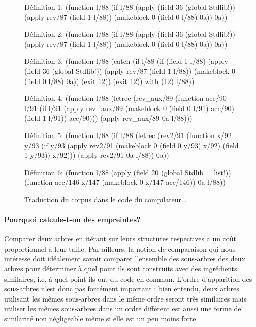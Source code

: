 \begin{figure}
\begin{lisp}
Définition 1: (function l/88
  (if l/88
    (apply (field 36 (global Stdlib!)) (apply rev/87 (field 1 l/88))
      (makeblock 0 (field 0 l/88) 0a))
    0a))

Définition 2: (function l/88
  (if l/88
    (apply (field 36 (global Stdlib!)) (apply rev/87 (field 1 l/88))
      (makeblock 0 (field 0 l/88) 0a))
    0a))

Définition 3: (function l/88
  (catch
    (if l/88
      (if (field 1 l/88)
        (apply (field 36 (global Stdlib!)) (apply rev/87 (field 1 l/88))
          (makeblock 0 (field 0 l/88) 0a))
        (exit 12))
      (exit 12))
   with (12) l/88))

Définition 4: (function l/88
  (letrec
    (rev_aux/89
       (function acc/90 l/91
         (if l/91
           (apply rev_aux/89 (makeblock 0 (field 0 l/91) acc/90)
             (field 1 l/91))
           acc/90)))
    (apply rev_aux/89 0a l/88)))

Définition 5: (function l/88
  (if l/88
    (letrec
      (rev2/91
         (function x/92 y/93
           (if y/93
             (apply rev2/91 (makeblock 0 (field 0 y/93) x/92) (field 1 y/93))
             x/92)))
      (apply rev2/91 0a l/88))
    0a))

Définition 6: (function l/88
  (apply (field 20 (global Stdlib__list!))
    (function acc/146 x/147 (makeblock 0 x/147 acc/146)) 0a l/88))
\end{lisp}
\caption{Traduction du corpus dans le code {\LambdaCode} du compilateur~\OCaml.}
\label{fig:lambda-corpus}
\end{figure}

\paragraph{Pourquoi calcule-t-on des empreintes?}

Comparer deux arbres en itérant sur leurs structures respectives a un
coût proportionnel à leur taille. Par ailleurs, la notion de
comparaison qui nous intéresse doit idéalement savoir comparer
l'ensemble des sous-arbres des deux arbres pour déterminer à quel
point ils sont construits avec des ingrédients similaires, i.e.  à
quel point ils ont du code en commun. L'ordre d'apparition des
sous-arbres n'est donc pas forcément important : bien entendu, deux
arbres utilisant les mêmes sous-arbres dans le même ordre seront
très similaires mais utiliser les mêmes sous-arbres dans un ordre
différent est aussi une forme de similarité non négligeable même
si elle est un peu moins forte.

